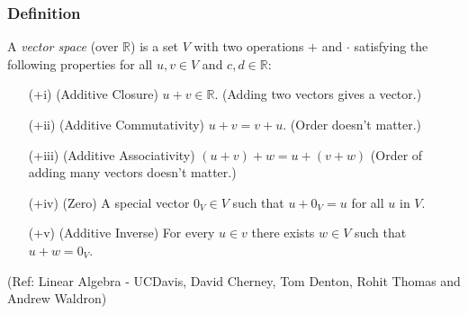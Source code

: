 \begin{frame}[fragile]
\frametitle{Definition}

\begin{definition} A \emph{vector space} (over $\mathbb{R}$) is a set $V$ with two operations $+$ and $\cdot$ satisfying the following properties for all $u, v \in V$ and $c, d \in \mathbb{R}$:

\begin{itemize}

\item[(+i)] (Additive Closure) $u+v \in \mathbb{R}$.  (Adding two vectors gives a vector.)

\item[(+ii)] (Additive Commutativity) $u+v=v+u$.  (Order doesn't matter.)

\item[(+iii)] (Additive Associativity) $(u+v)+w = u+(v+w)$  (Order of adding many vectors doesn't matter.)

\item[(+iv)] (Zero) A special vector $0_V \in V$ such that $u+0_V = u$ for all $u$ in $V$.

\item[(+v)] (Additive Inverse) For every $u \in v$ there exists $w \in V$ such that $u+w=0_V$.


\end{itemize}
\end{definition}

\tiny{(Ref: Linear Algebra - UCDavis, David Cherney, Tom Denton, Rohit Thomas and Andrew Waldron)}

\end{frame}

